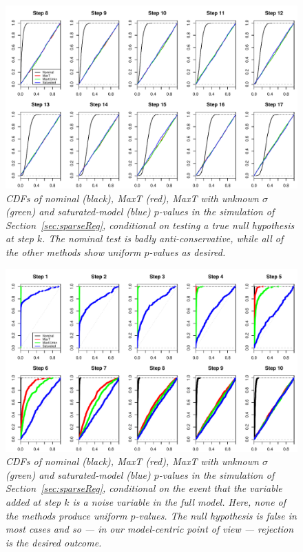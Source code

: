 \documentclass{article}
\begin{document}
\begin{figure}[h]
  \centering
  \includegraphics[width=1\textwidth]{figs/simulation_snr_5_alpha_05_null_true.pdf}
  \caption{\em  CDFs of nominal (black), MaxT (red), MaxT with unknown $\sigma$ (green) and  saturated-model (blue) $p$-values in the simulation of Section~\ref{sec:sparseReg}, conditional on testing a true null hypothesis at step $k$.  The nominal test is badly anti-conservative, while all of the other methods  show uniform $p$-values as desired.}
  \label{fig:simulation_null_true}
\end{figure}

\begin{figure}[h]
  \centering
  \includegraphics[width=1\textwidth]{figs/simulation_snr_5_alpha_05_noise_var.pdf}
  \caption{\em CDFs of nominal (black), MaxT (red), MaxT with unknown $\sigma$ (green) and  saturated-model (blue) $p$-values in the simulation of Section~\ref{sec:sparseReg}, conditional on the event that the variable added at step $k$ is a noise variable in the full model. Here, none of the methods produce uniform $p$-values. The null hypothesis is false in most cases and so --- in our model-centric point of view --- rejection is the desired outcome.}
  \label{fig:simulation_noise_var}
\end{figure}
\end{document}
